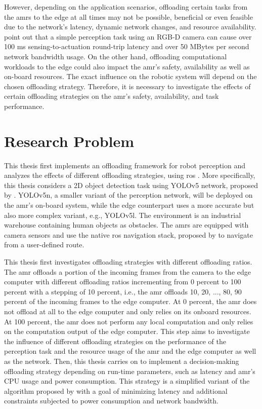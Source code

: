 However, depending on the application scenarios, offloading certain tasks from the \glspl{amr} to the edge at all times may not be possible, beneficial or even feasible due to the network's latency, dynamic network changes, and resource availability. \citeauthor*{Baxi2022} point out that a simple perception task using an RGB-D camera can cause over 100 ms sensing-to-actuation round-trip latency and over 50 MBytes per second network bandwidth usage. On the other hand, offloading computational workloads to the edge could also impact the \gls{amr}'s safety, availability as well as on-board resources. The exact influence on the robotic system will depend on the chosen offloading strategy. Therefore, it is necessary to investigate the effects of certain offloading strategies on the \gls{amr}'s safety, availability, and task performance.

\section{Research Problem}

This thesis first implements an offloading framework for robot perception and analyzes the effects of different offloading strategies, using \gls{ros} \cite{Macenski2022}. More specifically, this thesis considers a 2D object detection task using YOLOv5 network, proposed by \citeauthor*{Jocher2020}. YOLOv5n, a smaller variant of the perception network, will be deployed on the \gls{amr}'s on-board system, while the edge counterpart uses a more accurate but also more complex variant, e.g., YOLOv5l. The environment is an industrial warehouse containing human objects as obstacles. The \glspl{amr} are equipped with camera sensors and use the native \gls{ros} navigation stack, proposed by \citeauthor*{Macenski2020} to navigate from a user-defined route. 

This thesis first investigates offloading strategies with different offloading ratios. The \gls{amr} offloads a portion of the incoming frames from the camera to the edge computer with different offloading ratios incrementing from 0 percent to 100 percent with a stepping of 10 percent, i.e., the \gls{amr} offloads 10, 20, ..., 80, 90 percent of the incoming frames to the edge computer. At 0 percent, the \gls{amr} does not offload at all to the edge computer and only relies on its onboard resources. At 100 percent, the \gls{amr} does not perform any local computation and only relies on the computation output of the edge computer. This step aims to investigate the influence of different offloading strategies on the performance of the perception task and the resource usage of the \gls{amr} and the edge computer as well as the network. Then, this thesis carries on to implement a decision-making offloading strategy depending on run-time parameters, such as latency and \gls{amr}'s CPU usage and power consumption. This strategy is a simplified variant of the algorithm proposed by \citeauthor*{Ning2019} with a goal of minimizing latency and additional constraints subjected to power consumption and network bandwidth. 

